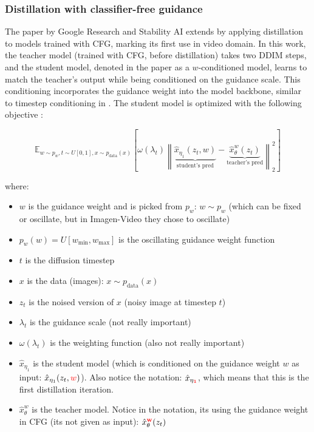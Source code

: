 \subsubsection*{Distillation with classifier-free guidance}

The paper \cite{meng2023distillation} by Google Research and Stability AI extends \cite{v_prediction} by applying distillation to models trained with CFG, marking its first use in video domain. In this work, the teacher model (trained with CFG, before distillation) takes two DDIM steps, and the student model, denoted in the paper as a $w$-conditioned model, learns to match the teacher's output while being conditioned on the guidance scale. This conditioning incorporates the guidance weight into the model backbone, similar to timestep conditioning in \cite{kingma2021variational}. The student model is optimized with the following objective \cite{meng2023distillation}:

\begin{equation*}
\mathbb{E}_{w \sim p_w, t \sim U[0, 1], x \sim p_{\text{data}}(x)} 
\left[ 
    \omega(\lambda_t) \left\| 
        \underbrace{\hat{x}_{\eta_1}(z_t, w)}_{\text{student's pred}} - 
        \underbrace{\hat{x}_{\theta}^w(z_t) }_{\text{teacher's pred}}
    \right\|_2^2 
\right]
\end{equation*}

where:

\begin{itemize}
    \item $w$ is the guidance weight and is picked from $p_w$: $w \sim p_w$ (which can be fixed or oscillate, but in Imagen-Video they chose to oscillate)
    \item $p_w(w) = U[w_{\text{min}}, w_{\text{max}}]$ is the oscillating guidance weight function
    \item $t$ is the diffusion timestep
    \item $x$ is the data (images): $x \sim p_{\text{data}}(x)$
    \item $z_t$ is the noised version of $x$ (noisy image at timestep $t$)
    \item $\lambda_t$ is the guidance scale (not really important)
    \item $\omega(\lambda_t)$ is the weighting function (also not really important)
    \item $\hat{x}_{\eta_1}$ is the student model (which is conditioned on the guidance weight $w$ as input: $\hat{x}_{\eta_1}(z_t, \textcolor{red}{w})$). Also notice the notation: $\hat{x}_{\eta_\mathbf{\textcolor{red}{1}}}$, which means that this is the first distillation iteration.
    \item $\hat{x}_{\theta}^w$ is the teacher model. Notice in the notation, its using the guidance weight in CFG (its not given as input): $\hat{x}_{\theta}^\mathbf{\textcolor{red}{w}}(z_t)$
\end{itemize}

